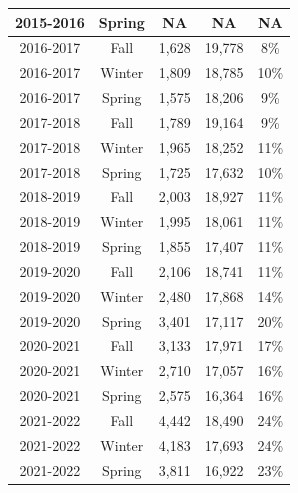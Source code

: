 \documentclass[10pt]{article}
\begin{document}
\begin{longtable}[c]{|c|c|c|c|c|}
	2015-2016              & Spring        & NA             & NA                  & NA                  \\ \hline
	2016-2017              & Fall          & 1,628          & 19,778              & 8\%                 \\ \hline
	2016-2017              & Winter        & 1,809          & 18,785              & 10\%                \\ \hline
	2016-2017              & Spring        & 1,575          & 18,206              & 9\%                 \\ \hline
	2017-2018              & Fall          & 1,789          & 19,164              & 9\%                 \\ \hline
	2017-2018              & Winter        & 1,965          & 18,252              & 11\%                \\ \hline
	2017-2018              & Spring        & 1,725          & 17,632              & 10\%                \\ \hline
	2018-2019              & Fall          & 2,003          & 18,927              & 11\%                \\ \hline
	2018-2019              & Winter        & 1,995          & 18,061              & 11\%                \\ \hline
	2018-2019              & Spring        & 1,855          & 17,407              & 11\%                \\ \hline
	2019-2020              & Fall          & 2,106          & 18,741              & 11\%                \\ \hline
	2019-2020              & Winter        & 2,480          & 17,868              & 14\%                \\ \hline
	2019-2020              & Spring        & 3,401          & 17,117              & 20\%                \\ \hline
	2020-2021              & Fall          & 3,133          & 17,971              & 17\%                \\ \hline
	2020-2021              & Winter        & 2,710          & 17,057              & 16\%                \\ \hline
	2020-2021              & Spring        & 2,575          & 16,364              & 16\%                \\ \hline
	2021-2022              & Fall          & 4,442          & 18,490              & 24\%                \\ \hline
	2021-2022              & Winter        & 4,183          & 17,693              & 24\%                \\ \hline
	2021-2022              & Spring        & 3,811          & 16,922              & 23\%                \\ \hline
\end{longtable}
\end{document}
